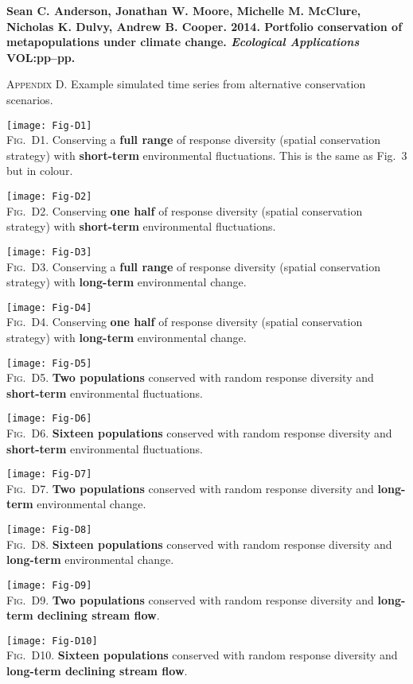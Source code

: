 \documentclass[12pt]{article}
\begin{document}
\textbf{Sean C. Anderson, Jonathan W. Moore, Michelle M. McClure, Nicholas K. Dulvy, Andrew B. Cooper. 2014. Portfolio conservation of metapopulations under climate change. \textit{Ecological Applications} VOL:pp--pp.}

\bigskip

\textsc{Appendix D.} Example simulated time series from alternative conservation scenarios.

\bigskip

\clearpage

\texttt{[image: Fig-D1]}\\
\textsc{Fig.~D1.} Conserving a \textbf{full range} of response diversity (spatial conservation strategy) with \textbf{short-term} environmental fluctuations. This is the same as Fig.~3 but in colour.
\clearpage

\texttt{[image: Fig-D2]}\\
\textsc{Fig.~D2.} Conserving \textbf{one half} of response diversity (spatial conservation strategy) with \textbf{short-term} environmental fluctuations.
\clearpage

\texttt{[image: Fig-D3]}\\
\textsc{Fig.~D3.} Conserving a \textbf{full range} of response diversity (spatial conservation strategy) with \textbf{long-term} environmental change.
\clearpage

\texttt{[image: Fig-D4]}\\
\textsc{Fig.~D4.} Conserving \textbf{one half} of response diversity (spatial conservation strategy) with \textbf{long-term} environmental change.
\clearpage

\texttt{[image: Fig-D5]}\\
\textsc{Fig.~D5.} \textbf{Two populations} conserved with random response diversity and \textbf{short-term} environmental fluctuations.
\clearpage

\texttt{[image: Fig-D6]}\\
\textsc{Fig.~D6.} \textbf{Sixteen populations} conserved with random response diversity and \textbf{short-term} environmental fluctuations.
\clearpage

\texttt{[image: Fig-D7]}\\
\textsc{Fig.~D7.} \textbf{Two populations} conserved with random response diversity and \textbf{long-term} environmental change.
\clearpage

\texttt{[image: Fig-D8]}\\
\textsc{Fig.~D8.} \textbf{Sixteen populations} conserved with random response diversity and \textbf{long-term} environmental change.
\clearpage

\texttt{[image: Fig-D9]}\\
\textsc{Fig.~D9.} \textbf{Two populations} conserved with random response diversity and \textbf{long-term declining stream flow}.
\clearpage

\texttt{[image: Fig-D10]}\\
\textsc{Fig.~D10.} \textbf{Sixteen populations} conserved with random response diversity and \textbf{long-term declining stream flow}.
\end{document}
